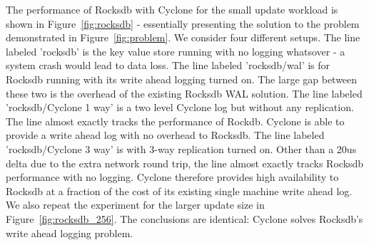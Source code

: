 \documentclass[pageno]{jpaper}
\begin{document}
The performance of Rocksdb with Cyclone for the small update workload is shown
in Figure~\ref{fig:rocksdb} - essentially presenting the solution to the problem
demonstrated in Figure~\ref{fig:problem}.  We consider four different
setups. The line labeled 'rocksdb' is the key value store running with no
logging whatsover - a system crash would lead to data loss. The line labeled
'rocksdb/wal' is for Rocksdb running with its write ahead logging turned on. The
large gap between these two is the overhead of the existing Rocksdb WAL
solution. The line labeled 'rocksdb/Cyclone 1 way' is a two level Cyclone log
but without any replication. The line almost exactly tracks the performance of
Rockdb. Cyclone is able to provide a write ahead log with no overhead to
Rocksdb. The line labeled 'rocksdb/Cyclone 3 way' is with 3-way replication
turned on. Other than a 20us delta due to the extra network round trip, the line
almost exactly tracks Rocksdb performance with no logging. Cyclone therefore
provides high availability to Rocksdb at a fraction of the cost of its existing
single machine write ahead log. We also repeat the experiment for the larger
update size in Figure~\ref{fig:rocksdb_256}. The conclusions are identical:
Cyclone solves Rocksdb's write ahead logging problem.
\end{document}
